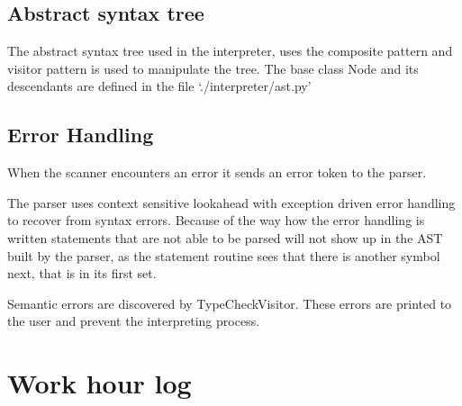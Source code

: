 \documentclass[12pt,a4paper]{article}
\begin{document}
\subsection{Abstract syntax tree}
The abstract syntax tree used in the interpreter, uses the composite pattern and visitor
pattern is used to manipulate the tree. The base class Node and its descendants are
defined in the file `./interpreter/ast.py'

\subsection{Error Handling}

When the scanner encounters an error it sends an error token to the parser.

The parser uses context sensitive lookahead with exception driven error
handling to recover from syntax errors. Because of the way how the error
handling is written statements that are not able to be parsed will not show up
in the AST built by the parser, as the statement routine sees that there is
another symbol next, that is in its first set.

Semantic errors are discovered by TypeCheckVisitor.
These errors are printed to the user and prevent the interpreting process.

\section{Work hour log}
\end{document}
